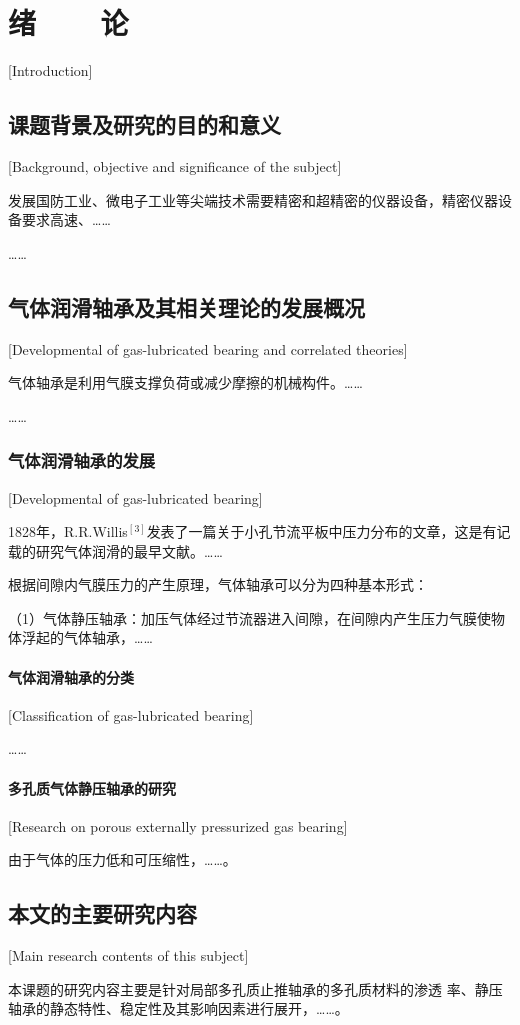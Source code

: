 
\chapter{绪~~~~论}[Introduction]

\section{课题背景及研究的目的和意义}[Background, objective and significance of the subject]

发展国防工业、微电子工业等尖端技术需要精密和超精密的仪器设备，精密仪器设备要求高速、\dots\dots

\dots\dots

\section{气体润滑轴承及其相关理论的发展概况}[Developmental of gas-lubricated bearing and correlated theories]

气体轴承是利用气膜支撑负荷或减少摩擦的机械构件。\dots\dots

\dots\dots

\subsection{气体润滑轴承的发展}[Developmental of gas-lubricated bearing]

1828年，R.R.Willis$^{[3]}$发表了一篇关于小孔节流平板中压力分布的文章，这是有记载的研究气体润滑的最早文献。\dots\dots

根据间隙内气膜压力的产生原理，气体轴承可以分为四种基本形式：

（1）气体静压轴承：加压气体经过节流器进入间隙，在间隙内产生压力气膜使物体浮起的气体轴承，\dots\dots

\subsubsection{气体润滑轴承的分类}[Classification of gas-lubricated bearing]

\dots\dots

\subsubsection{多孔质气体静压轴承的研究}[Research on porous externally pressurized gas bearing]

由于气体的压力低和可压缩性，\dots\dots。

\section{本文的主要研究内容}[Main research contents of this subject]

本课题的研究内容主要是针对局部多孔质止推轴承的多孔质材料的渗透
率、静压轴承的静态特性、稳定性及其影响因素进行展开，\dots\dots。
